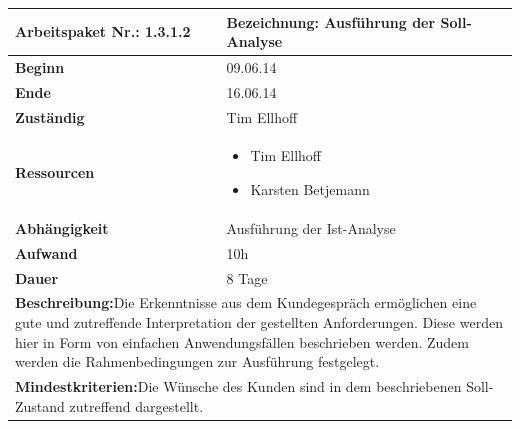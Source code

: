 \documentclass[fontsize=12pt,paper=a4,twoside]{scrartcl}
\begin{document}
\begin{verbatim} 
\end{verbatim}

\begin{tabular}{|p{5.3cm}|p{9.7cm}|}\hline
	\textbf{Arbeitspaket Nr.:} 1.3.1.2 & \textbf{Bezeichnung:} Ausführung der Soll-Analyse\\ \hline \hline
	\textbf{Beginn} & 09.06.14\\ \hline
	\textbf{Ende} & 16.06.14\\ \hline
	\textbf{Zuständig} & Tim Ellhoff\\ \hline
	\textbf{Ressourcen} & \begin{itemize}
		\item Tim Ellhoff
		\item Karsten Betjemann
	\end{itemize}    \\ \hline
	\textbf{Abhängigkeit} & Ausführung der Ist-Analyse\\ \hline
	\textbf{Aufwand} & 10h\\ \hline
	\textbf{Dauer} & 8 Tage\\ \hline
	\multicolumn{2}{|p{15cm}|}{\textbf{Beschreibung:}\newline Die Erkenntnisse aus dem Kundegespräch ermöglichen eine gute und zutreffende Interpretation der gestellten Anforderungen. Diese werden hier in Form von einfachen Anwendungsfällen beschrieben werden. Zudem werden die Rahmenbedingungen zur Ausführung festgelegt. }\\ \hline
	\multicolumn{2}{|p{15cm}|}{\textbf{Mindestkriterien:}\newline Die Wünsche des Kunden sind in dem beschriebenen Soll-Zustand zutreffend dargestellt. }\\ \hline
\end{tabular}

\begin{verbatim} 
\end{verbatim}
\end{document}
